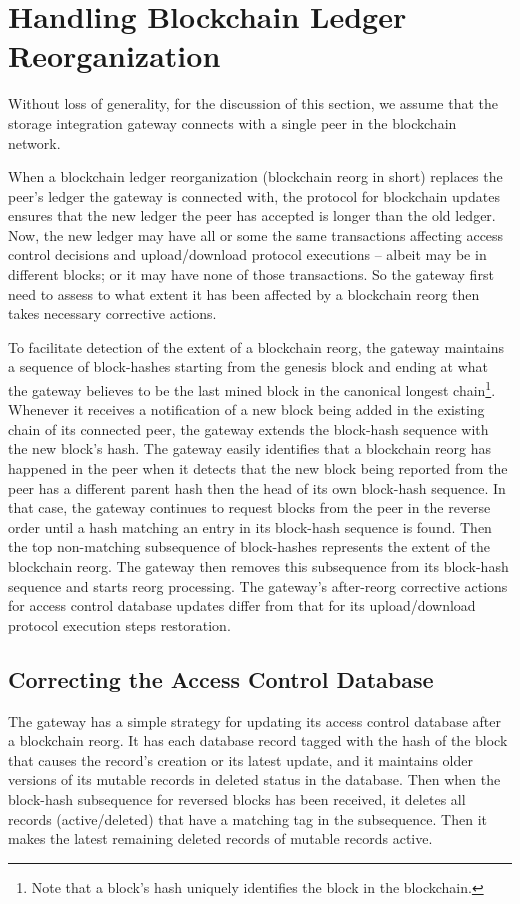 \section{Handling Blockchain Ledger Reorganization}
Without loss of generality, for the discussion of this section, we assume that the storage integration gateway connects with a single peer in the blockchain network.  

When a blockchain ledger reorganization (blockchain reorg in short) replaces the peer's ledger the gateway is connected with, the protocol for blockchain updates ensures that the new ledger the peer has accepted is longer than the old ledger. Now, the new ledger may have all or some the same transactions affecting access control decisions and upload/download protocol executions -- albeit may be in different blocks; or it may have none of those transactions. So the gateway first need to assess to what extent it has been affected by a blockchain reorg then takes necessary corrective actions.

To facilitate detection of the extent of a blockchain reorg, the gateway maintains a sequence of block-hashes starting from the genesis block and ending at what the gateway believes to be the last mined block in the canonical longest chain\footnote{Note that a block's hash uniquely identifies the block in the blockchain.}. Whenever it receives a notification of a new block being added in the existing chain of its connected peer, the gateway extends the block-hash sequence with the new block's hash. The gateway easily identifies that a blockchain reorg has happened in the peer when it detects that the new block being reported from the peer has a different parent hash then the head of its own block-hash sequence. In that case, the gateway continues to request blocks from the peer in the reverse order until a hash matching an entry in its block-hash sequence is found. Then the top non-matching subsequence of block-hashes represents the extent of the blockchain reorg. The gateway then removes this subsequence from its block-hash sequence and starts reorg processing. The gateway's after-reorg corrective actions for access control database updates differ from that for its upload/download protocol execution steps restoration.

\subsection{Correcting the Access Control Database}              
The gateway has a simple strategy for updating its access control database after a blockchain reorg. It has each database record tagged with the hash of the block that causes the record's creation or its latest update, and it maintains older versions of its mutable records in deleted status in the database. Then when the block-hash subsequence for reversed blocks has been received, it deletes all records (active/deleted) that have a matching tag in the subsequence. Then it makes the latest remaining deleted records of mutable records active. 


